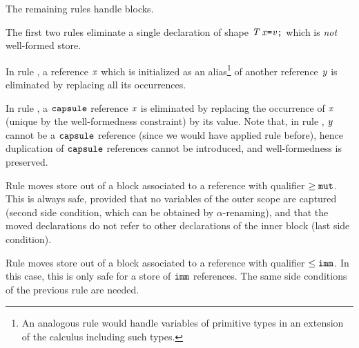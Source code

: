 The remaining rules handle blocks.

The first two rules eliminate a single declaration of shape $\mathit{T}\,\mathit{x}\texttt{=}\mathit{v}\texttt{;}$ which is \emph{not} well-formed store. 

 In rule , a reference $\mathit{x}$ which is initialized as an alias\footnote{{An analogous rule would handle variables of primitive types in an extension of the calculus including such types.}} of another reference $\mathit{y}$ is eliminated by replacing all its occurrences.
 
In rule , a $\texttt{capsule}$ reference $\mathit{x}$ is eliminated by replacing the occurrence of $\mathit{x}$ (unique by the well-formedness constraint) by its value. %
Note that, in rule , $\mathit{y}$ cannot be a $\texttt{capsule}$ reference (since we would have applied rule  before), hence  duplication of $\texttt{capsule}$ references cannot be introduced{, and well-formedness is preserved.} 

Rule  moves store out of a block associated to a {reference with qualifier $\geq\texttt{mut}$}. 
This is always safe, provided that no variables of the outer scope are captured (second side condition, which can be obtained by $\alpha$-renaming), and that the moved declarations do not refer to other declarations of the inner block (last side condition). 

Rule  moves store out of a block associated to a {reference with qualifier $\leq\texttt{imm}$}. In this case, this is only safe for a store of $\texttt{imm}$ references. The same side conditions of the previous rule are needed.









